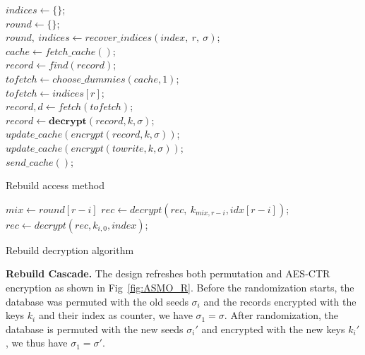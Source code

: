 \documentclass[USenglish,oneside,twocolumn]{article}
\begin{document}
\begin{algorithm}
\DontPrintSemicolon
{}
$indices \gets \{\}$;\\
$round\gets \{\}$;\\
{
$round,\ indices \gets recover\_indices(index,\ r,\ \sigma)$;\\
}
$cache \gets fetch\_cache()$;\\
{
$record \gets find(record)$;\\
$tofetch \gets choose\_dummies(cache, 1)$;\\
}
\Else
{
$tofetch \gets indices[r]$;\\
}
$record, d \gets fetch(tofetch)$;\\
$record \gets \textbf{decrypt}(record,k,\sigma)$;\\
{
$update\_cache(encrypt(record,k,\sigma))$;\\
}
\Else
{
$update\_cache(encrypt(towrite,k,\sigma))$;\\
}
$send\_cache()$;\\
\caption{Rebuild access method}
\label{alg:racc}
\end{algorithm}

\begin{algorithm}
\DontPrintSemicolon
{}
{
$mix \gets round[r-i]$
$rec \gets decrypt(rec,\ k_{mix,r-i}, idx[r-i] )$;\\
}
{
$rec \gets decrypt(rec, k_{i,0}, index )$;\\
}
\caption{Rebuild decryption algorithm}
\label{alg:rdec}
\end{algorithm}
%

\noindent\textbf{Rebuild Cascade.} The design refreshes both permutation and AES-CTR encryption as shown in Fig~\ref{fig:ASMO_R}. Before the randomization starts, the database was permuted with the old seeds $\sigma_i$ and the records encrypted with the keys $k_i$ and their index as counter, we have $\sigma_1=\sigma$.
After randomization, the database is permuted with the new seeds $\sigma_i'$ and encrypted with the new keys $k_i'$, we thus have $\sigma_1=\sigma'$.
\end{document}

